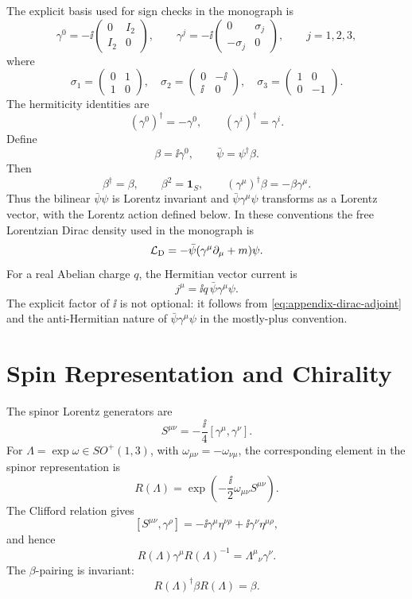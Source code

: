 The explicit basis used for sign checks in the monograph is
\begin{equation}
  \gamma^0
  =
  -\ii
  \begin{pmatrix}
    0&I_2\\ I_2&0
  \end{pmatrix},
  \qquad
  \gamma^j
  =
  -\ii
  \begin{pmatrix}
    0&\sigma_j\\ -\sigma_j&0
  \end{pmatrix},
  \qquad j=1,2,3,
  \label{eq:appendix-weinberg-gamma-basis}
\end{equation}
where
\[
  \sigma_1=\begin{pmatrix}0&1\\1&0\end{pmatrix},
  \quad
  \sigma_2=\begin{pmatrix}0&-\ii\\ \ii&0\end{pmatrix},
  \quad
  \sigma_3=\begin{pmatrix}1&0\\0&-1\end{pmatrix}.
\]
The hermiticity identities are
\[
  (\gamma^0)^\dagger=-\gamma^0,
  \qquad
  (\gamma^i)^\dagger=\gamma^i .
\]
Define
\begin{equation}
  \beta=\ii\gamma^0,
  \qquad
  \bar\psi=\psi^\dagger\beta .
  \label{eq:appendix-dirac-adjoint}
\end{equation}
Then
\[
  \beta^\dagger=\beta,
  \qquad
  \beta^2=\mathbf 1_S,
  \qquad
  (\gamma^\mu)^\dagger\beta=-\beta\gamma^\mu .
\]
Thus the bilinear \(\bar\psi\psi\) is Lorentz invariant and
\(\bar\psi\gamma^\mu\psi\) transforms as a Lorentz vector, with the Lorentz
action defined below.  In these conventions the free Lorentzian Dirac density
used in the monograph is
\[
  \mathcal L_{\rm D}=-\bar\psi(\gamma^\mu\partial_\mu+m)\psi .
\]
For a real Abelian charge \(q\), the Hermitian vector current is
\[
  j^\mu=\ii q\,\bar\psi\gamma^\mu\psi .
\]
The explicit factor of \(\ii\) is not optional: it follows from
\eqref{eq:appendix-dirac-adjoint} and the anti-Hermitian nature of
\(\bar\psi\gamma^\mu\psi\) in the mostly-plus convention.

\section{Spin Representation and Chirality}

The spinor Lorentz generators are
\begin{equation}
  S^{\mu\nu}
  =
  -\frac{\ii}{4}[\gamma^\mu,\gamma^\nu].
  \label{eq:appendix-spin-generators}
\end{equation}
For \(\Lambda=\exp\omega\in SO^+(1,3)\), with
\(\omega_{\mu\nu}=-\omega_{\nu\mu}\), the corresponding element in the
spinor representation is
\[
  R(\Lambda)
  =
  \exp\!\left(-\frac{\ii}{2}\omega_{\mu\nu}S^{\mu\nu}\right).
\]
The Clifford relation gives
\[
  [S^{\mu\nu},\gamma^\rho]
  =
  -\ii\gamma^\mu\eta^{\nu\rho}
  +\ii\gamma^\nu\eta^{\mu\rho},
\]
and hence
\[
  R(\Lambda)\gamma^\mu R(\Lambda)^{-1}
  =
  \Lambda^\mu{}_\nu\gamma^\nu .
\]
The \(\beta\)-pairing is invariant:
\[
  R(\Lambda)^\dagger\beta R(\Lambda)=\beta .
\]


